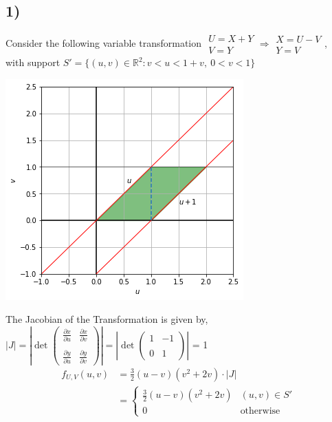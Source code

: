 \documentclass[11pt]{article}
\begin{document}
\subsection*{1)}
    Consider the following variable transformation $\begin{array}{l}
        U = X+Y \\ V = Y
    \end{array} \Rightarrow \begin{array}{l}
        X = U - V \\ Y = V
    \end{array}$, \\ 
    with support $S' = \{(u, v)\in \mathbb{R}^2: v < u < 1+v,\ 0 < v < 1\}$
    \begin{center}
        \includegraphics[scale=0.5]{../assets/support.png}
    \end{center}
    The Jacobian of the Transformation is given by,
    $|J| = \left\vert \det \begin{pmatrix}
        \frac{\partial x}{\partial u} & \frac{\partial x}{\partial v} \\
        \\
        \frac{\partial y}{\partial u} & \frac{\partial y}{\partial v}
    \end{pmatrix}\right\vert = \left | \det \begin{pmatrix}
        1 & -1 \\
        \\ 
        0 & 1 
    \end{pmatrix} \right |$ = 1
    \\
    \begin{align*}
        f_{U, V}(u, v) &= \frac{3}{2} (u - v) (v^2 + 2v) \cdot |J| \\ 
        &= \begin{cases} 
            \frac{3}{2} (u - v) (v^2 + 2v) & (u, v) \in S' \\
            0 & \text{otherwise} 
        \end{cases}
    \end{align*}
\end{document}
